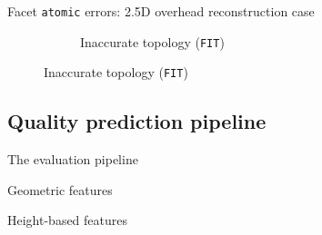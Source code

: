 \documentclass[10pt, export]{beamer}
\begin{document}
\begin{frame}{Facet \texttt{atomic} errors: 2.5D overhead reconstruction case}
{\begin{figure}
\begin{center}
\begin{subfigure}{.45\textwidth}
                                \caption{\label{fig::fac_height} Inaccurate topology (\texttt{FIT})}
                            \end{subfigure}
                        \end{center}
                    \end{figure}
                }
            \end{frame}
        \subsection{Quality prediction pipeline}
            \begin{frame}{The evaluation pipeline}
                \begin{figure}
                    
                \end{figure}
            \end{frame}
            \begin{frame}{Geometric features}
                \begin{figure}
                    
                \end{figure}
            \end{frame}
            \begin{frame}{Height-based features}
                \begin{figure}
                    
                \end{figure}
            \end{frame}
\end{document}
